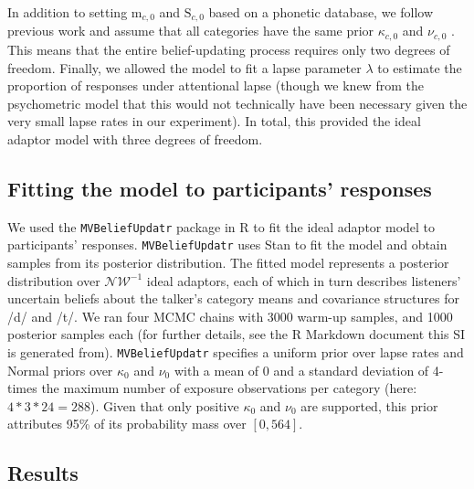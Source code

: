 \documentclass[
  11pt,
  man,mask,floatsintext]{apa6}
\begin{document}
In addition to setting \(\mathrm{m}_{c,0}\) and \(\mathrm{S}_{c,0}\) based on a phonetic database, we follow previous work and assume that all categories have the same prior \(\kappa_{c,0}\) and \(\nu_{c,0}\) \autocite{kleinschmidt-jaeger2015,kleinschmidt-jaeger2016,xie2023}. This means that the entire belief-updating process requires only two degrees of freedom. Finally, we allowed the model to fit a lapse parameter \(\lambda\) to estimate the proportion of responses under attentional lapse (though we knew from the psychometric model that this would not technically have been necessary given the very small lapse rates in our experiment). In total, this provided the ideal adaptor model with three degrees of freedom.

\subsection{Fitting the model to participants' responses}\label{fitting-the-model-to-participants-responses}

We used the \texttt{MVBeliefUpdatr} package \autocite{R-MVBeliefUpdatr} in R to fit the ideal adaptor model to participants' responses. \texttt{MVBeliefUpdatr} uses Stan \autocite{carpenter2017} to fit the model and obtain samples from its posterior distribution. The fitted model represents a posterior distribution over \(\mathcal{NW^{-1}}\) ideal adaptors, each of which in turn describes listeners' uncertain beliefs about the talker's category means and covariance structures for /d/ and /t/. We ran four MCMC chains with 3000 warm-up samples, and 1000 posterior samples each (for further details, see the R Markdown document this SI is generated from). \texttt{MVBeliefUpdatr} specifies a uniform prior over lapse rates and Normal priors over \(\kappa_{0}\) and \(\nu_{0}\) with a mean of 0 and a standard deviation of 4-times the maximum number of exposure observations per category (here: \(4 * 3 * 24 = 288\)). Given that only positive \(\kappa_{0}\) and \(\nu_{0}\) are supported, this prior attributes 95\% of its probability mass over \([0, 564]\).

\subsection{Results}\label{results-1}
\end{document}
